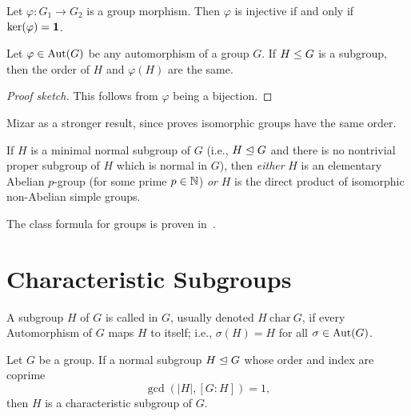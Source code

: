 \begin{theorem}
  Let $\varphi\colon G_{1}\to G_{2}$ is a group morphism.
  Then $\varphi$ is injective if and only if $\ker(\varphi)=\mathbf{1}$.
\end{theorem}


\begin{theorem}\label{thm:pure-math:iso-subgroups-have-same-order}
  Let $\varphi\in\operatorname{Aut}(G)$ be any automorphism of a group $G$.
  If $H\leq G$ is a subgroup, then the order of $H$ and
  $\varphi(H)$ are the same.
\end{theorem}

\begin{proof}[Proof sketch]
This follows from $\varphi$ being a bijection.
\end{proof}

\begin{thm-remark}
Mizar as a stronger result, since
\cite[Th73]{group6} proves isomorphic groups have the same order.
\end{thm-remark}

\begin{theorem}
  If $H$ is a minimal normal subgroup of $G$ (i.e., $H\trianglelefteq G$
  and there is no nontrivial proper subgroup of $H$ which is normal in
  $G$),
  then \emph{either} $H$ is an elementary Abelian $p$-group (for some
  prime $p\in\mathbb{N}$) \emph{or} $H$ is the direct product of isomorphic
  non-Abelian simple groups.
\end{theorem}

The class formula for groups is proven in~.

\section{Characteristic Subgroups}

\begin{definition}
A subgroup $H$ of $G$ is called  in $G$, usually
denoted $H~\mathrm{char}~G$, if every Automorphism of $G$ maps $H$ to
itself; i.e., $\sigma(H)=H$ for all $\sigma\in\operatorname{Aut}(G)$.
\end{definition}

\begin{theorem}
Let $G$ be a group. If a normal subgroup $H\trianglelefteq G$ whose
order and index are coprime
\begin{equation*}
\gcd(|H|, [G:H])=1,
\end{equation*}
then $H$ is a characteristic subgroup of $G$.
\end{theorem}

